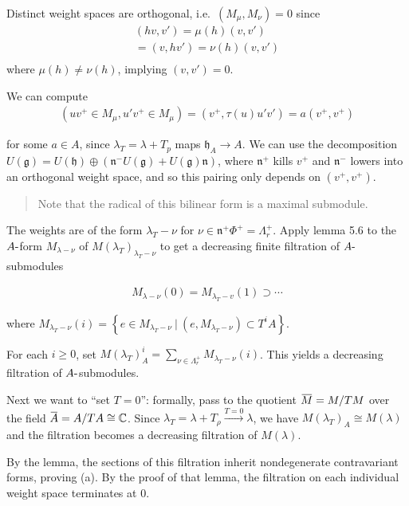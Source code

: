 \documentclass[11pt]{scrartcl}
\theoremstyle{definition}
\theoremstyle{theorem}
\theoremstyle{proof}
\theoremstyle{definition}
\theoremstyle{break}
\theoremstyle{problem}
\newcommand{\CC}[0]{{\mathbb{C}}}
\newcommand{\dash}[0]{{\hbox{-}}}
\newcommand{\lieg}[0]{{\mathfrak{g}}}
\newcommand{\lieh}[0]{{\mathfrak{h}}}
\newcommand{\lien}[0]{{\mathfrak{n}}}
\newcommand{\mapsvia}[1]{\xrightarrow{#1}}
\newcommand{\suchthat}[0]{{~\mathrel{\Big|}~}}
\newcommand{\theset}[1]{\left\{{#1}\right\}}
\renewcommand{\bar}[1]{\mkern 1.5mu\overline{\mkern-1.5mu#1\mkern-1.5mu}\mkern 1.5mu}
\renewcommand{\to}[0]{\longrightarrow}
\begin{document}
Distinct weight spaces are orthogonal, i.e.~\((M_\mu, M_\nu) = 0\) since
\begin{align*}
(hv, v') = \mu(h) (v, v') \\
= (v, hv') = \nu(h) (v, v') \\
\end{align*} where \(\mu(h) \neq \nu(h)\), implying \((v, v') = 0\).

We can compute \begin{align*}
(u v^+ \in M_\mu, u' v^+ \in M_\mu) = (v^+, \tau(u) u' v') = a (v^+, v^+)
\end{align*}

for some \(a\in A\), since \(\lambda_T = \lambda + T_p\) maps
\(\lieh_A \to A\). We can use the decomposition
\(U(\lieg) = U(\lieh) \oplus (\lien^- U(\lieg) + U(\lieg) \lien)\),
where \(\lien^+\) kills \(v^+\) and \(\lien^-\) lowers into an
orthogonal weight space, and so this pairing only depends on
\((v^+, v^+)\).

\begin{quote}
Note that the radical of this bilinear form is a maximal submodule.
\end{quote}

The weights are of the form \(\lambda_T - \nu\) for
\(\nu \in \lien^+ \Phi^+ = \Lambda_r^+\). Apply lemma 5.6 to the
\(A\dash\)form \(M_{\lambda - \nu}\) of
\(M(\lambda_T)_{\lambda_T - \nu}\) to get a decreasing finite filtration
of \(A\dash\)submodules

\begin{align*}
M_{\lambda-\nu}(0)=M_{\lambda_{T}-v}(1) \supset \cdots
\end{align*}

where
\(M_{\lambda_T - \nu}(i) = \theset{e\in M_{\lambda_T - \nu} \suchthat (e, M_{\lambda_T - \nu}) \subset T^i A}\).

For each \(i \geq 0\), set
\(M(\lambda_T)_A^i = \sum_{\nu \in \Lambda_r^+} M_{\lambda_T - \nu}(i)\).
This yields a decreasing filtration of \(A\dash\)submodules.

Next we want to ``set \(T=0\)'': formally, pass to the quotient
\(\bar M = M/TM\) over the field \(\bar A = A/TA \cong \CC\). Since
\(\lambda_T = \lambda + T_\rho \mapsvia{T = 0} \lambda\), we have
\(M(\lambda_T)_A \cong M(\lambda)\) and the filtration becomes a
decreasing filtration of \(M(\lambda)\).

By the lemma, the sections of this filtration inherit nondegenerate
contravariant forms, proving (a). By the proof of that lemma, the
filtration on each individual weight space terminates at 0.
\end{document}
